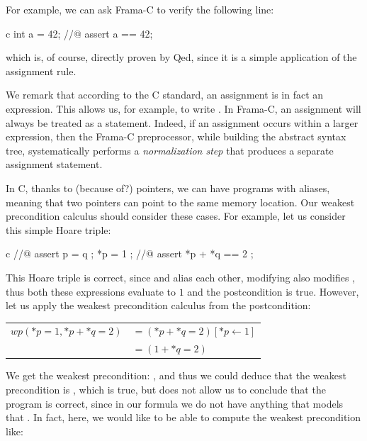 For example, we can ask Frama-C to verify the following line:
\begin{CodeBlock}{c}
int a = 42;
//@ assert a == 42;
\end{CodeBlock}
which is, of course, directly proven by Qed, since it is a simple
application of the assignment rule.



\begin{Information}
  We remark that according to the C standard, an assignment is in fact an
  expression. This allows us, for example, to write
  .
  In Frama-C, an assignment will always be treated as a statement. Indeed,
  if an assignment occurs within a larger expression, then the Frama-C
  preprocessor, while building the abstract syntax tree, systematically
  performs a \emph{normalization step} that produces a separate assignment
  statement.
\end{Information}






In C, thanks to (because of?) pointers, we can have programs with aliases,
meaning that two pointers can point to the same memory location. Our weakest
precondition calculus should consider these cases. For example, let us consider
this simple Hoare triple:


\begin{CodeBlock}{c}
//@ assert p = q ;
*p = 1 ;
//@ assert *p + *q == 2 ;
\end{CodeBlock}



This Hoare triple is correct, since  and 
alias each other, modifying  also modifies , thus both these
expressions evaluate to $1$ and the postcondition is true. However, let us apply
the weakest precondition calculus from the postcondition:



\begin{tabular}{ll}
$wp(*p = 1, *p + *q = 2)$ & $= (*p + *q = 2)[*p \leftarrow 1]$\\
                          & $= (1 + *q = 2)$
\end{tabular}



We get the weakest precondition: , and thus we could
deduce that the weakest precondition is , which is true, but
does not allow us to conclude that the program is correct, since in our formula
we do not have anything that models that . In
fact, here, we would like to be able to compute the weakest precondition like:



